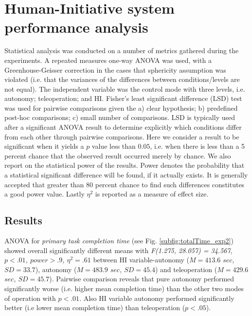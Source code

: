 \documentclass[a4paper,12pt,oneside,openright]{bhamthesis}
\begin{document}
\section{Human-Initiative system performance analysis}

Statistical analysis was conducted on a number of metrics gathered during the experiments. A repeated measures one-way ANOVA was used, with a Greenhouse-Geisser correction in the cases that sphericity assumption was violated (i.e. that the variances of the differences between conditions/levels are not equal). The independent variable was the control mode with three levels, i.e. autonomy; teleoperation; and HI. Fisher's least significant difference (LSD) test was used for pairwise comparisons given the a) clear hypothesis; b) predefined post-hoc comparisons; c) small number of comparisons. LSD is typically used after a significant ANOVA result to determine explicitly which conditions differ from each other through pairwise comparisons. Here we consider a result to be significant when it yields a $p$ value less than $0.05$, i.e. when there is less than a 5 percent chance that the observed result occurred merely by chance. We also report on the statistical power of the results. Power denotes the probability that a statistical significant difference will be found, if it actually exists. It is generally accepted that greater than 80 percent chance to find such differences constitutes a good power value. Lastly $\eta^2$ is reported as a measure of effect size.

\subsection{Results}\label{chapter4:results_system}
ANOVA for \textit{primary task completion time} (see Fig. \ref{subfig:totalTime_exp2}) showed overall significantly different means with \textit{F(1.275, 28.057) = 34.567,  $p < .01$, $power > .9$, $\eta^2 = .61$} between HI variable-autonomy (\textit{$M = 413.6$ $sec$, $SD = 33.7$}), autonomy (\textit{$M = 483.9$ $sec$, $SD = 45.4$}) and teleoperation (\textit{$M = 429.6$ $sec$, $SD = 45.7$}). Pairwise comparison reveals that pure autonomy performed significantly worse (i.e. higher mean completion time) than the other two modes of operation with \textit{$p <.01$}. Also HI variable autonomy performed significantly better (i.e lower mean completion time) than teleoperation (\textit{$p <.05$}). 
\end{document}
